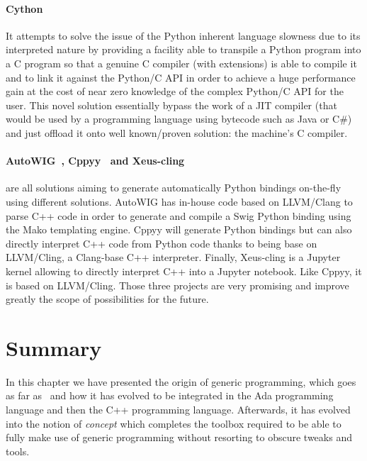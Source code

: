 \paragraph{Cython~\parencite{behnel.2010.cython}} It attempts to solve the issue of the Python inherent language
slowness due to its interpreted nature by providing a facility able to transpile a Python program into a C program so
that a genuine C compiler (with extensions) is able to compile it and to link it against the Python/C API in order to
achieve a huge performance gain at the cost of near zero knowledge of the complex Python/C API for the user. This novel
solution essentially bypass the work of a JIT compiler (that would be used by a programming language using bytecode such
as Java or C\#) and just offload it onto well known/proven solution: the machine's C compiler.

\paragraph{AutoWIG~\parencite{fernique.2018.autowig}, Cppyy~\parencite{wimtlplavrijsen.2016.cppyy} and
  Xeus-cling~\parencite{quantstack.2021.xeus-cling}} are all solutions aiming to generate automatically Python bindings
on-the-fly using different solutions. AutoWIG has in-house code based on LLVM/Clang to parse C++ code in order to
generate and compile a Swig Python binding using the Mako templating engine. Cppyy will generate Python bindings but can
also directly interpret C++ code from Python code thanks to being base on LLVM/Cling, a Clang-base C++ interpreter.
Finally, Xeus-cling is a Jupyter~\parencite{kluyver.2016.jupyter} kernel allowing to directly interpret C++ into a
Jupyter notebook. Like Cppyy, it is based on LLVM/Cling. Those three projects are very promising and improve greatly the
scope of possibilities for the future.


\section{Summary}

In this chapter we have presented the origin of generic programming, which goes as far
as~ and how it has evolved to be integrated in the Ada programming language and then
the C++ programming language. Afterwards, it has evolved into the notion of \emph{concept} which completes the toolbox
required to be able to fully make use of generic programming without resorting to obscure tweaks and tools.

